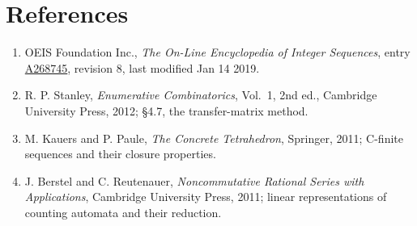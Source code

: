 \documentclass[11pt]{article}
\theoremstyle{definition}
\begin{document}
\section{References}

\begin{enumerate}

\item OEIS Foundation Inc., \emph{The On-Line Encyclopedia of Integer Sequences}, entry \href{https://oeis.org/A268745}{A268745}, revision 8, last modified Jan 14 2019.

\item R. P. Stanley, \emph{Enumerative Combinatorics}, Vol.~1, 2nd ed., Cambridge University Press, 2012; \S4.7, the transfer-matrix method.

\item M. Kauers and P. Paule, \emph{The Concrete Tetrahedron}, Springer, 2011; C-finite sequences and their closure properties.

\item J. Berstel and C. Reutenauer, \emph{Noncommutative Rational Series with Applications}, Cambridge University Press, 2011; linear representations of counting automata and their reduction.

\end{enumerate}
\end{document}
